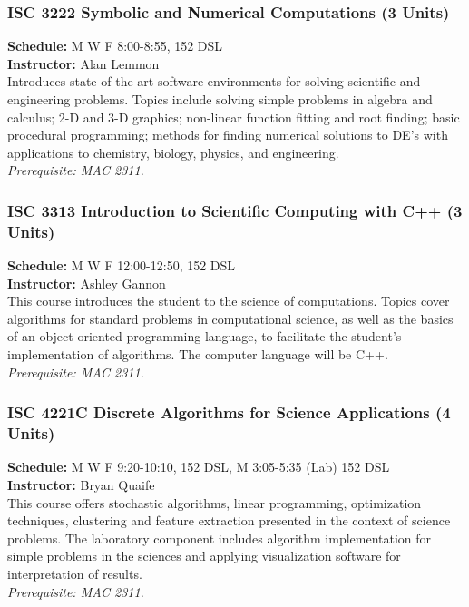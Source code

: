 \documentclass[12pt,a4paper]{article}
\begin{document}
\subsubsection*{ISC 3222 Symbolic and Numerical Computations (3 Units)}
\textbf{Schedule:} M W F 8:00-8:55, 152 DSL \\
\textbf{Instructor:} Alan Lemmon \\
Introduces state-of-the-art software environments for solving scientific and engineering problems. Topics include solving simple problems in algebra and calculus; 2-D and 3-D graphics; non-linear function fitting and root finding; basic procedural programming; methods for finding numerical solutions to DE's with applications to chemistry, biology, physics, and engineering. \\
\textit{Prerequisite: MAC 2311.}

\subsubsection*{ISC 3313 Introduction to Scientific Computing with C++ (3 Units)}
\textbf{Schedule:} M W F 12:00-12:50, 152 DSL \\
\textbf{Instructor:} Ashley Gannon \\
This course introduces the student to the science of computations. Topics cover algorithms for standard problems in computational science, as well as the basics of an object-oriented programming language, to facilitate the student’s implementation of algorithms. The computer language will be C++. \\
\textit{Prerequisite: MAC 2311.}

\subsubsection*{ISC 4221C Discrete Algorithms for Science Applications (4 Units)}
\textbf{Schedule:} M W F 9:20-10:10, 152 DSL, M 3:05-5:35 (Lab) 152 DSL \\
\textbf{Instructor:} Bryan Quaife \\
This course offers stochastic algorithms, linear programming, optimization techniques, clustering and feature extraction presented in the context of science problems. The laboratory component includes algorithm implementation for simple problems in the sciences and applying visualization software for interpretation of results. \\
\textit{Prerequisite: MAC 2311.}
\end{document}
